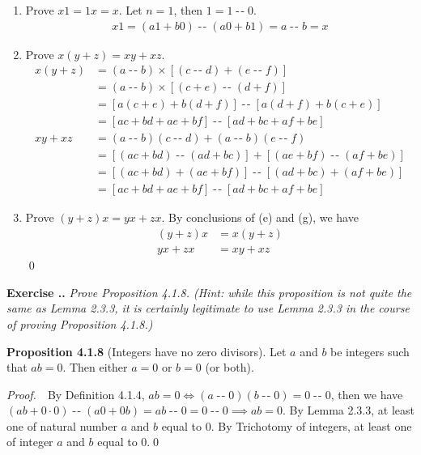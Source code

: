 \documentclass{book}
\DeclareMathOperator{\tminus}{-\!-}%
\newcommand{\pff}{\vspace{.25em}\noindent\emph{Proof.}~~}
\newcommand{\titl}[1]{\noindent\textbf{#1}}
\newcounter{Exercise}[section]
\renewcommand{\theExercise}{\thesection.\arabic{Exercise}.}
\newcommand{\new}{\vspace{1.5em}\noindent\textbf{{Exercise \stepcounter{Exercise}\textbf{\theExercise}}} }
\begin{document}
\begin{enumerate}
    \item Prove $x1=1x=x$. Let $n=1$, then $1=1\tminus0$.
        \begin{align*}
            x1=(a1+b0)\tminus(a0+b1)=a\tminus b=x
        \end{align*}

    \item Prove $x(y+z)=xy+xz$.
        \begin{align*}
            x(y+z)&=(a\tminus b)\times [(c\tminus d)+(e\tminus f)]\\
                &=(a\tminus b)\times [(c+e)\tminus(d+f)]\\
                &=[a(c+e)+b(d+f)]\tminus[a(d+f)+b(c+e)]\\
                &=[ac+bd+ae+bf]\tminus[ad+bc+af+be]\\
            xy+xz&=(a\tminus b)(c\tminus d)+(a\tminus b)(e\tminus f)\\
                &=[(ac+bd)\tminus(ad+bc)]+[(ae+bf)\tminus(af+be)]\\
                &=[(ac+bd)+(ae+bf)]\tminus[(ad+bc)+(af+be)]\\
                &=[ac+bd+ae+bf]\tminus[ad+bc+af+be]
        \end{align*}

    \item Prove $(y+z)x=yx+zx$. By conclusions of (e) and (g), we have
        \begin{align*}
            (y+z)x&=x(y+z)\\
            yx+zx&=xy+xz
        \end{align*}\qed
\end{enumerate}

\new\emph{Prove Proposition 4.1.8. (Hint: while this proposition is not quite the same as Lemma 2.3.3, it is certainly legitimate to use Lemma 2.3.3 in the course of proving Proposition 4.1.8.)}

\begin{framed}
\titl{Proposition 4.1.8} (Integers have no zero divisors). Let $a$ and $b$ be integers such that $ab=0$. Then either $a=0$ or $b=0$ (or both).
\end{framed}

\pff By Definition 4.1.4, $ab=0\iff(a\tminus0)(b\tminus0)=0\tminus0$, then we have $(ab+0\cdot0)\tminus(a0+0b)=ab\tminus0=0\tminus0\implies ab=0$. By Lemma 2.3.3, at least one of natural number $a$ and $b$ equal to $0$. By Trichotomy of integers, at least one of integer $a$ and $b$ equal to 0.\qed
\end{document}
